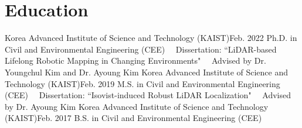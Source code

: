 \section{Education}

  \resumeSubHeadingListStart
    \resumeSubheadingFourLines
      {Korea Advanced Institute of Science and Technology (KAIST)}{Feb. 2022}
      {Ph.D. in Civil and Environmental Engineering (CEE)}{ } 
      {\ \ Dissertation: ``LiDAR-based Lifelong Robotic Mapping in Changing Environments"}{}
      {\ \ Advised by Dr. Youngchul Kim and Dr. Ayoung Kim}{}
    \vspace{1mm}
    \resumeSubheadingFourLines
      {Korea Advanced Institute of Science and Technology (KAIST)}{Feb. 2019}
      {M.S. in Civil and Environmental Engineering (CEE)}{ } 
      {\ \ Dissertation: ``Isovist-induced Robust LiDAR Localization"}{}
      {\ \ Advised by Dr. Ayoung Kim}{}
    \vspace{1mm}
    \resumeSubheading
      {Korea Advanced Institute of Science and Technology (KAIST)}{Feb. 2017}
      {B.S. in Civil and Environmental Engineering (CEE)}{ }
  \resumeSubHeadingListEnd
